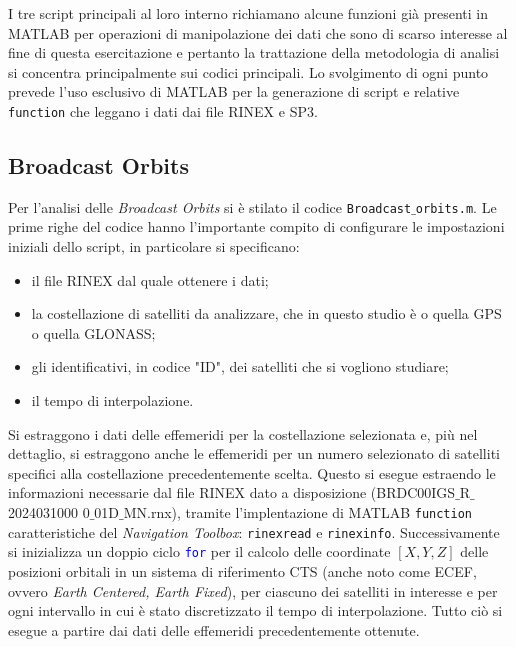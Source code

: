 \documentclass[a4paper,11pt,twoside]{book}
\begin{document}
	I tre script principali al loro interno richiamano alcune funzioni già presenti in MATLAB per operazioni di manipolazione dei dati che sono di scarso interesse al fine di questa esercitazione e pertanto la trattazione della metodologia di analisi si concentra principalmente sui codici principali. Lo svolgimento di ogni punto prevede l'uso esclusivo di MATLAB per la generazione di script e relative \texttt{function} che leggano i dati dai file RINEX e SP3.

	
	\subsection{Broadcast Orbits}
	
	Per l'analisi delle \textit{Broadcast Orbits} si è stilato il codice \texttt{Broadcast$\_$orbits.m}. Le prime righe del codice hanno l'importante compito di configurare le impostazioni iniziali dello script, in particolare si specificano:
	
	\begin{itemize}[-]
		\item il file RINEX dal quale ottenere i dati;
		
		\item la costellazione di satelliti da analizzare, che in questo studio è o quella GPS o quella GLONASS;
		
		\item gli identificativi, in codice "ID", dei satelliti che si vogliono studiare;
		
		\item il tempo di interpolazione.
	\end{itemize}

	Si estraggono i dati delle effemeridi per la costellazione selezionata e, più nel dettaglio, si estraggono anche le effemeridi per un numero selezionato di satelliti specifici alla costellazione precedentemente scelta. Questo si esegue estraendo le informazioni necessarie dal file RINEX dato a disposizione (BRDC00IGS$\_$R$\_$2024031000 0$\_$01D$\_$MN.rnx), tramite l'implentazione di MATLAB \texttt{function} caratteristiche del \textit{Navigation Toolbox}: \texttt{rinexread} e \texttt{rinexinfo}.
	Successivamente si inizializza un doppio ciclo \texttt{\textcolor{blue}{for}} per il calcolo delle coordinate $[X,Y,Z]$ delle posizioni orbitali in un sistema di riferimento CTS (anche noto come ECEF, ovvero \textit{Earth Centered, Earth Fixed}), per ciascuno dei satelliti in interesse e per ogni intervallo in cui è stato discretizzato il tempo di interpolazione. Tutto ciò si esegue a partire dai dati delle effemeridi precedentemente ottenute.
	
\end{document}
